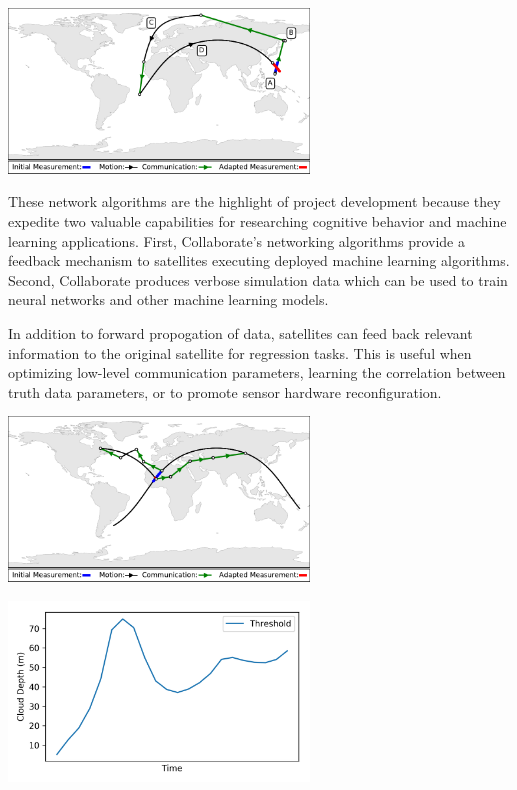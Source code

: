 \documentclass[11pt]{article}
\begin{document}
\begin{center}
\includegraphics[width=0.6\textwidth]{./images/collaborate.pdf}
\end{center}

These network algorithms are the highlight of project development because they
expedite two valuable capabilities for researching cognitive behavior and
machine learning applications.  First, Collaborate's networking algorithms
provide a feedback mechanism to satellites executing deployed machine learning
algorithms.  Second, Collaborate produces verbose simulation data which can be
used to train neural networks and other machine learning models.

In addition to forward propogation of data, satellites can feed back relevant
information to the original satellite for regression tasks.  This is useful when
optimizing low-level communication parameters, learning the correlation between
truth data parameters, or to promote sensor hardware reconfiguration.

\begin{center}
\includegraphics[width=0.6\textwidth]{./images/loop.pdf}
\end{center}

\begin{center}
\includegraphics[width=0.6\textwidth]{./images/regression.png}
\end{center}
\end{document}
